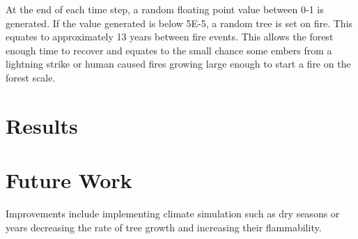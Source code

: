 \documentclass[ aps, pra, reprint, notitlepage ]{revtex4-1}
\begin{document}
At the end of each time step, a random floating point value between 0-1 is generated. If the value generated is below 5E-5, a random tree is set on fire. This equates to approximately 13 years between fire events. This allows the forest enough time to recover and equates to the small chance some embers from a lightning strike or human caused fires growing large enough to start a fire on the forest scale.

\section{\label{Results}Results}




\section{\label{FutureWork}Future Work}

Improvements include implementing climate simulation such as dry seasons or years decreasing the rate of tree growth and increasing their flammability.



%

\end{document}
